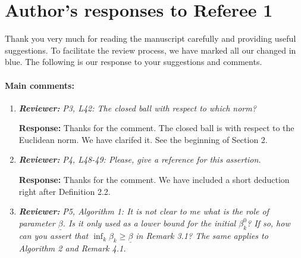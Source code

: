 \documentclass{article}
\begin{document}
\section*{Author's responses to Referee 1}
Thank you very much for reading the manuscript carefully and providing useful suggestions. To facilitate the review process, we have marked all our changed in blue.  The following is our response to your suggestions and comments.

\paragraph{Main comments:}
\begin{enumerate}
	\item  \textit{\textbf{Reviewer:}} \textit{P3, L42: The closed ball with respect to which norm?}
	
	\textbf{Response:} Thanks for the comment. The closed ball is with respect to the Euclidean norm. We have clarifed it. See the beginning of Section 2.

	\item  \textit{\textbf{Reviewer:}} \textit{P4, L48-49: Please, give a reference for this assertion.}
	
	\textbf{Response:} Thanks for the comment. We have included a short deduction right after Definition 2.2.

	\item  \textit{\textbf{Reviewer:}} \textit{P5, Algorithm 1: It is not clear to me what is the role of parameter $\underline{\beta}$. Is it only used as a lower bound for the initial $\beta_k^0$? If so, how can you assert that $\inf_k \beta_k \ge \underline{\beta}$ in Remark 3.1? The same applies to Algorithm 2 and Remark 4.1.}
	

\end{enumerate}
\end{document}
